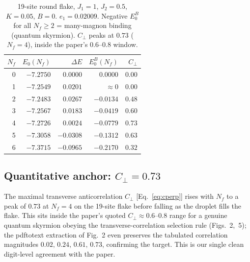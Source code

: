 \documentclass[11pt]{article}
\newcommand{\Cperp}{C_{\perp}}
\begin{document}
\begin{table}[h]
\centering
\begin{tabular}{rrrrr}
\toprule
$N_f$ & $E_0(N_f)$ & $\Delta E$ & $E_0^B(N_f)$ & $\Cperp$ \\
\midrule
0 & $-7.2750$ & $ 0.0000$ & $ 0.0000$ & $0.00$ \\
1 & $-7.2549$ & $ 0.0201$ & $\approx 0$ & $0.00$ \\
2 & $-7.2483$ & $ 0.0267$ & $-0.0134$ & $0.48$ \\
3 & $-7.2567$ & $ 0.0183$ & $-0.0419$ & $0.60$ \\
4 & $-7.2726$ & $ 0.0024$ & $-0.0779$ & $\mathbf{0.73}$ \\
5 & $-7.3058$ & $-0.0308$ & $-0.1312$ & $0.63$ \\
6 & $-7.3715$ & $-0.0965$ & $-0.2170$ & $0.32$ \\
\bottomrule
\end{tabular}
\caption{19-site round flake, $J_1=1$, $J_2=0.5$, $K=0.05$, $B=0$. $e_1=0.02009$. Negative
$E_0^B$ for all $N_f\ge2$ = many-magnon binding (quantum skyrmion). $\Cperp$ peaks at $0.73$
($N_f=4$), inside the paper's $0.6$--$0.8$ window.}
\label{tab:binding19}
\end{table}

\subsection{Quantitative anchor: $\Cperp = 0.73$}
The maximal transverse anticorrelation $\Cperp$ [Eq.~\eqref{eq:cperp}] rises with $N_f$ to a peak of
$\mathbf{0.73}$ at $N_f=4$ on the 19-site flake before falling as the droplet fills the flake. This
sits inside the paper's quoted $\Cperp\approx 0.6$--$0.8$ range for a genuine quantum skyrmion
obeying the transverse-correlation selection rule (Figs.~2,~5); the pdftotext extraction of Fig.~2
even preserves the tabulated correlation magnitudes $0.02,\,0.24,\,0.61,\,0.73$, confirming the
target. This is our single clean digit-level agreement with the paper.
\end{document}
